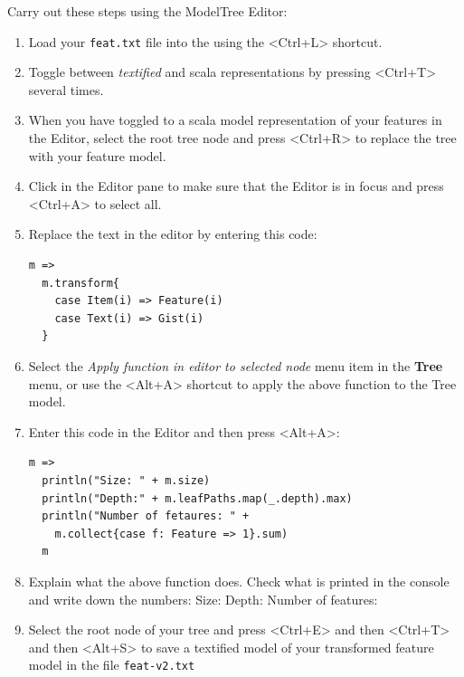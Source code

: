 \documentclass[11pt]{article}
\begin{document}
\begin{framed}
Carry out these steps using the ModelTree Editor:
\begin{enumerate}
\item Load your \verb+feat.txt+ file into the using the <Ctrl+L> shortcut.
\item Toggle between {\it textified} and scala representations by pressing <Ctrl+T> several times.
\item When you have toggled to a scala model representation of your features in the Editor, select the root tree node and press <Ctrl+R> to replace the tree with your feature model.
\item Click in the Editor pane to make sure that the Editor is in focus and press <Ctrl+A> to select all.
\item Replace the text in the editor by entering this code: {\scriptsize\begin{verbatim}
m =>
  m.transform{
    case Item(i) => Feature(i)
    case Text(i) => Gist(i)
  }
\end{verbatim}}
\item Select the {\it Apply function in editor to selected node} menu item in the {\bf Tree} menu, or use the <Alt+A> shortcut to apply the above function to the Tree model.
\item Enter this code in the Editor and then press <Alt+A>: {\scriptsize\begin{verbatim}
m =>
  println("Size: " + m.size)
  println("Depth:" + m.leafPaths.map(_.depth).max)
  println("Number of fetaures: " + 
    m.collect{case f: Feature => 1}.sum)
  m
\end{verbatim}}
\item Explain what the above function does. Check what is printed in the console and write down the numbers: 
\newline Size: \underline{\hspace{2cm}}
\newline Depth: \underline{\hspace{2cm}}
\newline Number of features: \underline{\hspace{2cm}}

\item Select the root node of your tree and press <Ctrl+E> and then <Ctrl+T> and then <Alt+S> to save a textified model of your transformed feature model in the file \verb+feat-v2.txt+
\end{enumerate}
\end{framed}
\end{document}
